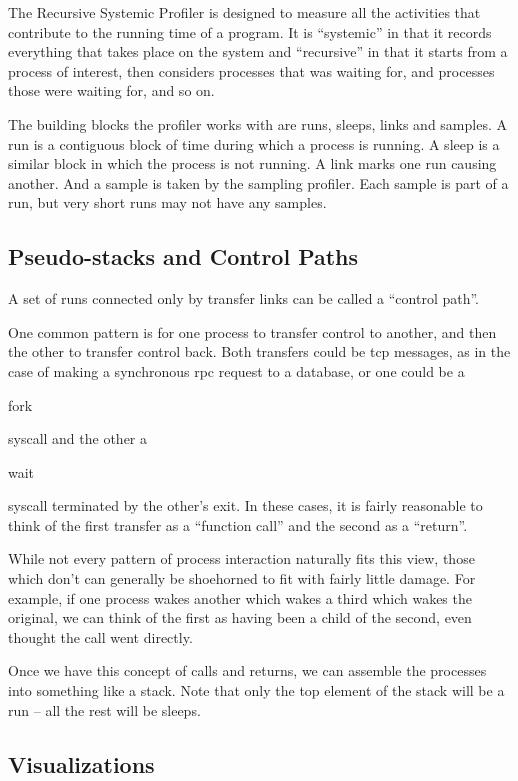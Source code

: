 \documentclass[10pt]{article}
\begin{document}
The Recursive Systemic Profiler is designed to measure all the activities that contribute to the running time of a program.  It is ``systemic'' in that it records everything that takes place on the system and ``recursive'' in that it starts from a process of interest, then considers processes that was waiting for, and processes those were waiting for, and so on.

The building blocks the profiler works with are runs, sleeps, links and samples.  A run is a contiguous block of time during which a process is running.  A sleep is a similar block in which the process is not running.  A link marks one run causing another.  And a sample is taken by the sampling profiler.  Each sample is part of a run, but very short runs may not have any samples.

\subsection{Pseudo-stacks and Control Paths}

A set of runs connected only by transfer links can be called a ``control path''.

One common pattern is for one process to transfer control to another, and then the other to transfer control back.  Both transfers could be tcp messages, as in the case of making a synchronous rpc request to a database, or one could be a \begin{tt}fork\end{tt} syscall and the other a \begin{tt}wait\end{tt} syscall terminated by the other's exit.  In these cases, it is fairly reasonable to think of the first transfer as a ``function call'' and the second as a ``return''.

While not every pattern of process interaction naturally fits this view, those which don't can generally be shoehorned to fit with fairly little damage.  For example, if one process wakes another which wakes a third which wakes the original, we can think of the first as having been a child of the second, even thought the call went directly.

Once we have this concept of calls and returns, we can assemble the processes into something like a stack.  Note that only the top element of the stack will be a run -- all the rest will be sleeps.

\subsection{Visualizations}
\end{document}

